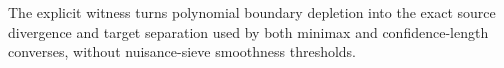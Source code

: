 The explicit witness turns polynomial boundary depletion into the exact source divergence and target separation used by both minimax and confidence-length converses, without nuisance-sieve smoothness thresholds.